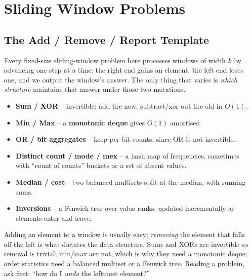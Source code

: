 \chapter{Sliding Window Problems}

\section{The Add / Remove / Report Template}
\label{sec:cses-sw-intro}

Every fixed-size sliding-window problem here processes windows of width
$k$ by advancing one step at a time: the right end gains an element, the
left end loses one, and we output the window's answer. The only thing that
varies is \emph{which structure} maintains that answer under those two
mutations.

\begin{ideabox}
\begin{itemize}
  \item \textbf{Sum / XOR} -- invertible: add the new, subtract/xor out
        the old in $O(1)$.
  \item \textbf{Min / Max} -- a \textbf{monotonic deque} gives $O(1)$
        amortised.
  \item \textbf{OR / bit aggregates} -- keep per-bit counts, since OR is
        not invertible.
  \item \textbf{Distinct count / mode / mex} -- a hash map of frequencies,
        sometimes with ``count of counts'' buckets or a set of absent
        values.
  \item \textbf{Median / cost} -- two balanced multisets split at the
        median, with running sums.
  \item \textbf{Inversions} -- a Fenwick tree over value ranks,
        updated incrementally as elements enter and leave.
\end{itemize}
\end{ideabox}

\begin{patternbox}
Adding an element to a window is usually easy; \emph{removing} the element
that falls off the left is what dictates the data structure. Sums and XORs
are invertible so removal is trivial; min/max are not, which is why they
need a monotonic deque; order statistics need a balanced multiset or a
Fenwick tree. Reading a problem, ask first: ``how do I \emph{undo} the
leftmost element?''
\end{patternbox}

